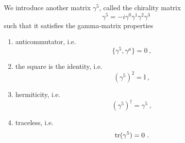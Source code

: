     We introduce another matrix $\gamma^5$, called the chirality matrix
    \begin{equation*}
        \gamma^5 = - i \gamma^0 \gamma^1 \gamma^2 \gamma^3
    \end{equation*}
    such that it satisfies the gamma-matrix properties
    \begin{enumerate}
        \item anticommutator, i.e.
            \begin{equation*}
                \{\gamma^5, \gamma^\mu\} = 0 ~,
            \end{equation*}
        \item the square is the identity, i.e.
            \begin{equation}\label{sqgamma}
                (\gamma^5)^2 = \mathbb I ~,
            \end{equation}
        \item hermiticity, i.e.
            \begin{equation*}
                (\gamma^5)^\dagger = \gamma^5 ~,
            \end{equation*}
        \item traceless, i.e.
            \begin{equation*}
                \operatorname{tr}(\gamma^5) = 0 ~.
            \end{equation*}
    \end{enumerate}
